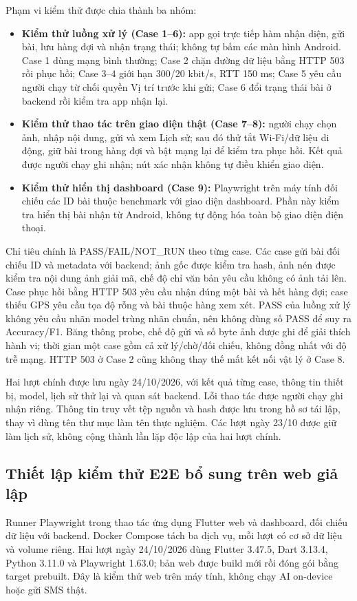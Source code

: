 Phạm vi kiểm thử được chia thành ba nhóm:
\begin{itemize}
\item \textbf{Kiểm thử luồng xử lý (Case 1--6):} app gọi trực tiếp hàm nhận diện, gửi bài, lưu hàng đợi và nhận trạng thái; không tự bấm các màn hình Android. Case 1 dùng mạng bình thường; Case 2 chặn đường dữ liệu bằng HTTP 503 rồi phục hồi; Case 3--4 giới hạn 300/20 kbit/s, RTT 150 ms; Case 5 yêu cầu người chạy từ chối quyền Vị trí trước khi gửi; Case 6 đổi trạng thái bài ở backend rồi kiểm tra app nhận lại.
\item \textbf{Kiểm thử thao tác trên giao diện thật (Case 7--8):} người chạy chọn ảnh, nhập nội dung, gửi và xem Lịch sử; sau đó thử tắt Wi-Fi/dữ liệu di động, giữ bài trong hàng đợi và bật mạng lại để kiểm tra phục hồi. Kết quả được người chạy ghi nhận; nút xác nhận không tự điều khiển giao diện.
\item \textbf{Kiểm thử hiển thị dashboard (Case 9):} Playwright trên máy tính đối chiếu các ID bài thuộc benchmark với giao diện dashboard. Phần này kiểm tra hiển thị bài nhận từ Android, không tự động hóa toàn bộ giao diện điện thoại.
\end{itemize}

Chỉ tiêu chính là PASS/FAIL/NOT\_RUN theo từng case. Các case gửi bài đối chiếu ID và metadata với backend; ảnh gốc được kiểm tra hash, ảnh nén được kiểm tra nội dung ảnh giải mã, chế độ chỉ văn bản yêu cầu không có ảnh tải lên. Case phục hồi bằng HTTP 503 yêu cầu nhận đúng một bài và hết hàng đợi; case thiếu GPS yêu cầu tọa độ rỗng và bài thuộc hàng xem xét. PASS của luồng xử lý không yêu cầu nhãn model trùng nhãn chuẩn, nên không dùng số PASS để suy ra Accuracy/F1. Băng thông probe, chế độ gửi và số byte ảnh được ghi để giải thích hành vi; thời gian một case gồm cả xử lý/chờ/đối chiếu, không đồng nhất với độ trễ mạng. HTTP 503 ở Case 2 cũng không thay thế mất kết nối vật lý ở Case 8.

Hai lượt chính được lưu ngày 24/10/2026, với kết quả từng case, thông tin thiết bị, model, lịch sử thử lại và quan sát backend. Lỗi thao tác được người chạy ghi nhận riêng. Thông tin truy vết tệp nguồn và hash được lưu trong hồ sơ tái lập, thay vì dùng tên thư mục làm tên thực nghiệm. Các lượt ngày 23/10 được giữ làm lịch sử, không cộng thành lần lặp độc lập của hai lượt chính.

\subsection{Thiết lập kiểm thử E2E bổ sung trên web giả lập}\label{sec:web-e2e-setup}
Runner Playwright trong  thao tác ứng dụng Flutter web và dashboard, đối chiếu dữ liệu với backend. Docker Compose tách ba dịch vụ, mỗi lượt có cơ sở dữ liệu và volume riêng. Hai lượt ngày 24/10/2026 dùng Flutter 3.47.5, Dart 3.13.4, Python 3.11.0 và Playwright 1.63.0; bản web được build mới rồi đóng gói bằng target prebuilt. Đây là kiểm thử web trên máy tính, không chạy AI on-device hoặc gửi SMS thật.

